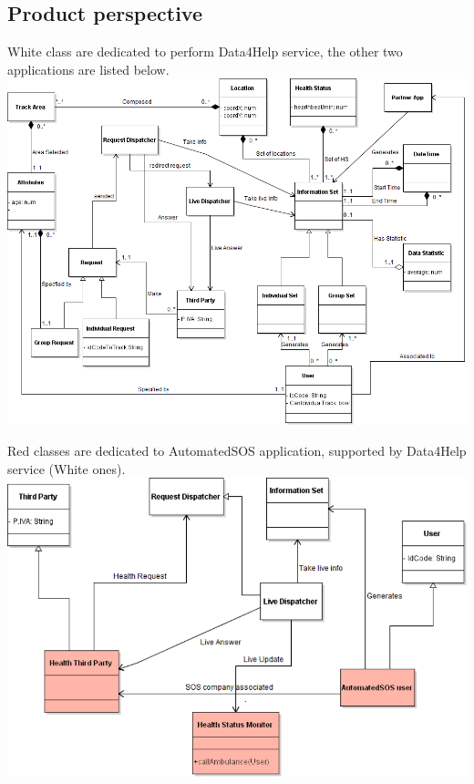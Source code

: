 
\subsection{Product perspective}

\begin{center}
White class are dedicated to perform Data4Help service, the other two applications are listed below.
\includegraphics[scale=0.5]{Images/Class_Data4Help.png}
\end{center}

\begin{center}
{\color{Salmon} Red classes} are dedicated to {\color{Salmon} AutomatedSOS} application, supported by Data4Help service (White ones).
\includegraphics[scale=0.5]{Images/Class_AutoSOS.png}
\end{center}

